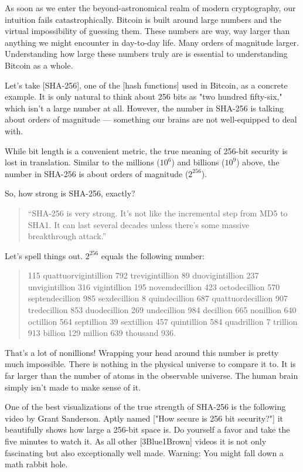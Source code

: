 As soon as we enter the beyond-astronomical realm of modern
cryptography, our intuition fails catastrophically. Bitcoin is built
around large numbers and the virtual impossibility of guessing them.
These numbers are way, way larger than anything we might encounter in
day-to-day life. Many orders of magnitude larger. Understanding how
large these numbers truly are is essential to understanding Bitcoin as a
whole.

Let's take [SHA-256], one of the [hash functions] used in Bitcoin, as a
concrete example. It is only natural to think about 256 bits as "two
hundred fifty-six," which isn't a large number at all. However, the
number in SHA-256 is talking about orders of magnitude --- something our
brains are not well-equipped to deal with.

While bit length is a convenient metric, the true meaning of 256-bit
security is lost in translation. Similar to the millions ($10^6$) and
billions ($10^9$) above, the number in SHA-256 is about orders of magnitude
($2^{256}$).

So, how strong is SHA-256, exactly?

\begin{quotation}
``SHA-256 is very strong. It's not like the incremental step from MD5
to SHA1. It can last several decades unless there's some massive
breakthrough attack.''
\end{quotation}

Let's spell things out. $2^{256}$ equals the following number:

\begin{quotation}
    115 quattuorvigintillion 792 trevigintillion 89 duovigintillion 237
    unvigintillion 316 vigintillion 195 novemdecillion 423 octodecillion 570
    septendecillion 985 sexdecillion 8 quindecillion 687 quattuordecillion 907
    tredecillion 853 duodecillion 269 undecillion 984 decillion 665 nonillion
    640 octillion 564 septillion 39 sextillion 457 quintillion 584 quadrillion 7
    trillion 913 billion 129 million 639 thousand 936.
\end{quotation}

That's a lot of nonillions! Wrapping your head around this number is
pretty much impossible. There is nothing in the physical universe to
compare it to. It is far larger than the number of atoms in the
observable universe. The human brain simply isn't made to make sense of
it.

One of the best visualizations of the true strength of SHA-256 is the
following video by Grant Sanderson. Aptly named ["How secure is 256 bit
security?"] it beautifully shows how large a 256-bit space is. Do
yourself a favor and take the five minutes to watch it. As all other
[3Blue1Brown] videos it is not only fascinating but also exceptionally
well made. Warning: You might fall down a math rabbit hole.


